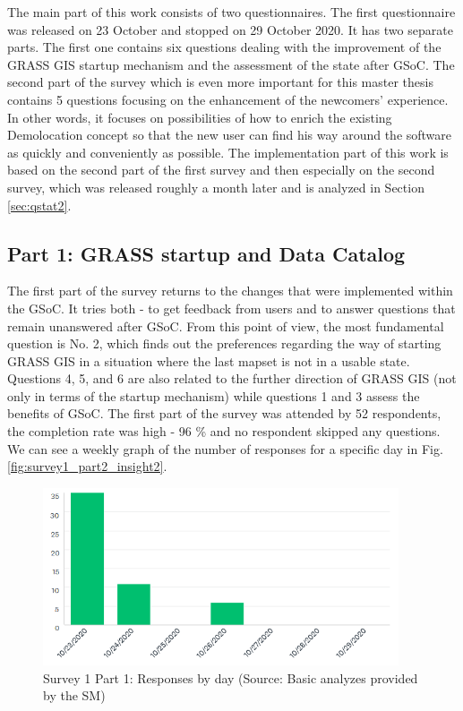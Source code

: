 \documentclass[a4paper,10pt,twoside]{article}
\begin{document}
\noindent The main part of this work consists of two questionnaires. The first questionnaire was released on 23 October and stopped on 29 October 2020. It has two separate parts. The first one contains six questions dealing with the improvement of the GRASS GIS startup mechanism and the assessment of the state after GSoC. The second part of the survey which is even more important for this master thesis contains 5 questions focusing on the enhancement of the newcomers' experience. In other words, it focuses on possibilities of how to enrich the existing Demolocation concept so that the new user can find his way around the software as quickly and conveniently as possible. The implementation part of this work is based on the second part of the first survey and then especially on the second survey, which was released roughly a month later and is analyzed in Section \ref{sec:qstat2}.

\subsection{Part 1: GRASS startup and Data Catalog}

\noindent The first part of the survey returns to the changes that were implemented within the GSoC. It tries both - to get feedback from users and to answer questions that remain unanswered after GSoC. From this point of view, the most fundamental question is No. 2, which finds out the preferences regarding the way of starting GRASS GIS in a situation where the last mapset is not in a usable state. Questions 4, 5, and 6 are also related to the further direction of GRASS GIS (not only in terms of the startup mechanism) while questions 1 and 3 assess the benefits of GSoC. The first part of the survey was attended by 52 respondents, the completion rate was high - 96 \% and no respondent skipped any questions. We can see a weekly graph of the number of responses for a specific day in Fig. \ref{fig:survey1_part2_insight2}.

\begin{figure}[hbt!] 
\begin{center}
\includegraphics[width=10.5cm]{../surveys/analyzed_data/survey1_part1_insight2.png} 
\caption[Survey 1 Part 1: Responses by day]{Survey 1 Part 1: Responses by day (Source: Basic analyzes provided by the SM)}
\label{fig:survey1_part1_insight2}
\end{center}
\end{figure}
\end{document}

